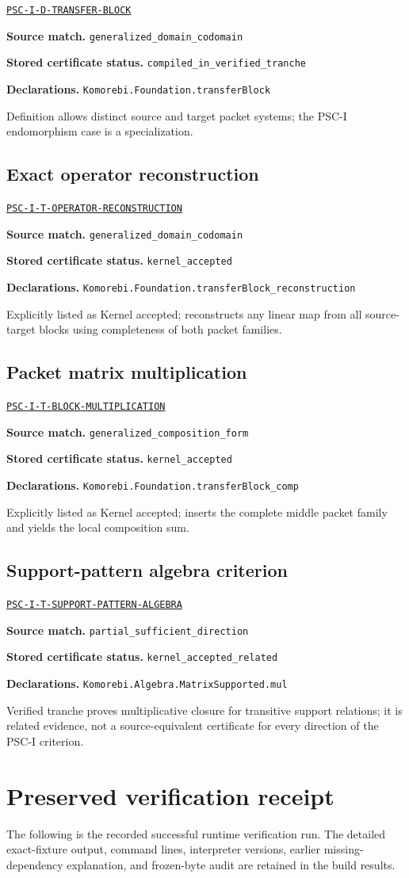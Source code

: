\documentclass[a4paper,11pt]{article}
\newcommand{\field}[2]{\par\smallskip\noindent\textbf{#1.} #2\par}
\begin{document}
\hyperref[rec:PSC-I-D-TRANSFER-BLOCK]{\nolinkurl{PSC-I-D-TRANSFER-BLOCK}}
\field{Source match}{\nolinkurl{generalized_domain_codomain}}
\field{Stored certificate status}{\nolinkurl{compiled_in_verified_tranche}}
\field{Declarations}{\nolinkurl{Komorebi.Foundation.transferBlock}}
Definition allows distinct source and target packet systems; the PSC-I endomorphism case is a specialization.
\subsection*{Exact operator reconstruction}
\hyperref[rec:PSC-I-T-OPERATOR-RECONSTRUCTION]{\nolinkurl{PSC-I-T-OPERATOR-RECONSTRUCTION}}
\field{Source match}{\nolinkurl{generalized_domain_codomain}}
\field{Stored certificate status}{\nolinkurl{kernel_accepted}}
\field{Declarations}{\nolinkurl{Komorebi.Foundation.transferBlock_reconstruction}}
Explicitly listed as Kernel accepted; reconstructs any linear map from all source-target blocks using completeness of both packet families.
\subsection*{Packet matrix multiplication}
\hyperref[rec:PSC-I-T-BLOCK-MULTIPLICATION]{\nolinkurl{PSC-I-T-BLOCK-MULTIPLICATION}}
\field{Source match}{\nolinkurl{generalized_composition_form}}
\field{Stored certificate status}{\nolinkurl{kernel_accepted}}
\field{Declarations}{\nolinkurl{Komorebi.Foundation.transferBlock_comp}}
Explicitly listed as Kernel accepted; inserts the complete middle packet family and yields the local composition sum.
\subsection*{Support-pattern algebra criterion}
\hyperref[rec:PSC-I-T-SUPPORT-PATTERN-ALGEBRA]{\nolinkurl{PSC-I-T-SUPPORT-PATTERN-ALGEBRA}}
\field{Source match}{\nolinkurl{partial_sufficient_direction}}
\field{Stored certificate status}{\nolinkurl{kernel_accepted_related}}
\field{Declarations}{\nolinkurl{Komorebi.Algebra.MatrixSupported.mul}}
Verified tranche proves multiplicative closure for transitive support relations; it is related evidence, not a source-equivalent certificate for every direction of the PSC-I criterion.
\clearpage\section{Preserved verification receipt}
The following is the recorded successful runtime verification run. The detailed exact-fixture output, command lines, interpreter versions, earlier missing-dependency explanation, and frozen-byte audit are retained in the build results.
\end{document}
